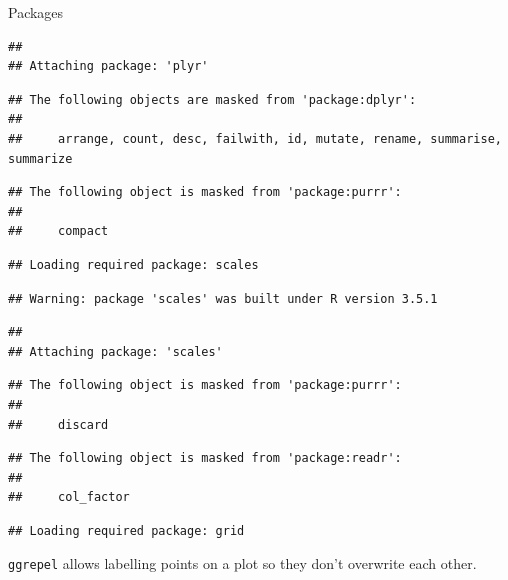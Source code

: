 \documentclass[ignorenonframetext,]{beamer}
\begin{document}
\begin{frame}[fragile]{Packages}
\begin{verbatim}
## 
## Attaching package: 'plyr'
\end{verbatim}

\begin{verbatim}
## The following objects are masked from 'package:dplyr':
## 
##     arrange, count, desc, failwith, id, mutate, rename, summarise, summarize
\end{verbatim}

\begin{verbatim}
## The following object is masked from 'package:purrr':
## 
##     compact
\end{verbatim}

\begin{verbatim}
## Loading required package: scales
\end{verbatim}

\begin{verbatim}
## Warning: package 'scales' was built under R version 3.5.1
\end{verbatim}

\begin{verbatim}
## 
## Attaching package: 'scales'
\end{verbatim}

\begin{verbatim}
## The following object is masked from 'package:purrr':
## 
##     discard
\end{verbatim}

\begin{verbatim}
## The following object is masked from 'package:readr':
## 
##     col_factor
\end{verbatim}

\begin{verbatim}
## Loading required package: grid
\end{verbatim}

\texttt{ggrepel} allows labelling points on a plot so they don't
overwrite each other.

\end{frame}
\end{document}

